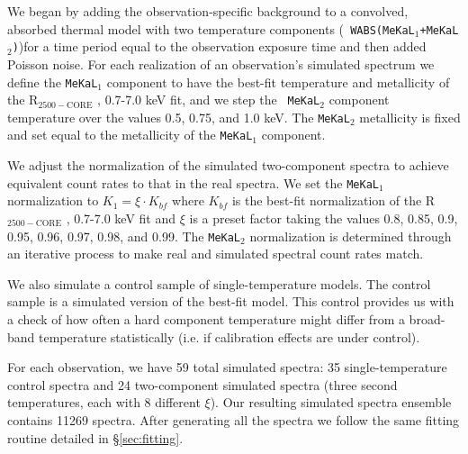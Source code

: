 \documentclass{emulateapj}
\newcommand{\rtwf}{R$_{2500-\text{CORE}}$ }
\begin{document}
We began by adding the observation-specific background to a convolved,
absorbed thermal model with two temperature components ({\tt
WABS(MeKaL$_1$+MeKaL$_2$)})for a time period equal to the observation
exposure time and then added Poisson noise. For each realization of an
observation's simulated spectrum we define the {\tt MeKaL$_1$}
component to have the best-fit temperature and metallicity of the
\rtwf, 0.7-7.0 keV fit, and we step the {\tt
MeKaL$_2$} component temperature over the values 0.5, 0.75, and 1.0
keV. The {\tt MeKaL$_2$} metallicity is fixed and set equal to the
metallicity of the {\tt MeKaL$_1$} component.

We adjust the normalization of the simulated two-component spectra to
achieve equivalent count rates to that in the real spectra. We
set the {\tt MeKaL$_1$} normalization to $K_1 = \xi \cdot K_{bf}$
where $K_{bf}$ is the best-fit normalization of the
\rtwf, 0.7-7.0 keV fit and $\xi$ is a preset factor
taking the values 0.8, 0.85, 0.9, 0.95, 0.96, 0.97, 0.98, and
0.99. The {\tt MeKaL$_2$} normalization is determined through an
iterative process to make real and simulated spectral count rates match.

We also simulate a control sample of single-temperature models. The
control sample is a simulated version of the best-fit model. This
control provides us with a check of how often a hard component
temperature might differ from a broad-band temperature statistically
(i.e. if calibration effects are under control).

For each observation, we have 59 total simulated spectra: 35
single-temperature control spectra and 24 two-component simulated
spectra (three second temperatures, each with 8 different $\xi$). Our
resulting simulated spectra ensemble contains 11269 spectra. After
generating all the spectra we follow the same fitting routine detailed
in \S\ref{sec:fitting}.
\end{document}
